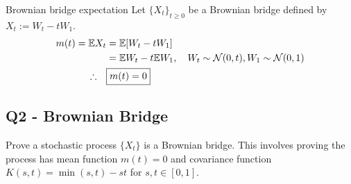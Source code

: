 \begin{fact}{Brownian bridge expectation}{}
Let $\{X_t\}_{t\geq 0}$ be a Brownian bridge defined by $X_t:= W_t - tW_1$.
\begin{align*}
m(t) = \mathbb{E} X_t 
	&= \mathbb{E}[W_t - tW_1] \\
	&= \mathbb{E} W_t - t\mathbb{E} W_1 , \quad W_t\sim\mathcal{N}(0, t), 
		W_1 \sim \mathcal{N}(0, 1)\\
\therefore\quad & \boxed{ m(t) =  0 } \\
\end{align*}
\end{fact}


\subsection{Q2 - Brownian Bridge}
Prove a stochastic process $\{X_t\}$ is a Brownian bridge. This involves proving the process has mean function $m(t) = 0$ and covariance function $K(s, t) = \min(s, t) - st$ for $s,t\in[0,1]$. 

